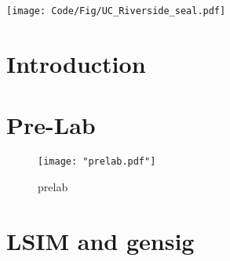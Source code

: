 \documentclass[12pt]{article}
\begin{document}
\begin{titlepage}
		\newcommand*{\plogo}{\texttt{[image: Code/Fig/UC\_Riverside\_seal.pdf]}}
		
		\plogo\\[1cm] %
		
		
		\vfill %
	\end{titlepage}
	
	\newpage
	
	\tableofcontents
	\pagebreak
	\listoffigures
	\lstlistoflistings  
	\pagebreak
	
	
	\section{Introduction}
	
	\section{Pre-Lab}
		\begin{figure}[H]
			\centering
			\texttt{[image: "prelab.pdf"]}
			\caption{prelab}
			\label{fig:prelab}
		\end{figure}
	
	\section{LSIM and gensig}
		
		
		
\end{document}
